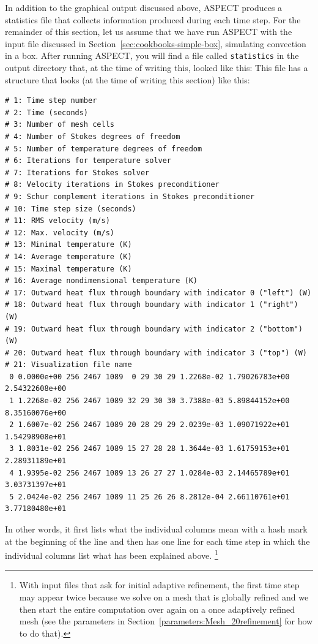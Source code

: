 \documentclass{article}
\newcommand{\aspect}{\textsc{ASPECT}}
\begin{document}
In addition to the graphical output discussed above, \aspect{} produces a
statistics file that collects information produced during each time step.
For the remainder of this section, let us assume that we have run \aspect{}
with the input file discussed in Section~\ref{sec:cookbooks-simple-box},
simulating convection in a box. After running \aspect{}, you will find
a file called \texttt{statistics} in the output directory that, at the time
of writing this, looked like this:
This file has a structure that looks (at the time of writing this section)
like this:
\begin{lstlisting}[frame=single,language=ksh,showstringspaces=false]
# 1: Time step number
# 2: Time (seconds)
# 3: Number of mesh cells
# 4: Number of Stokes degrees of freedom
# 5: Number of temperature degrees of freedom
# 6: Iterations for temperature solver
# 7: Iterations for Stokes solver
# 8: Velocity iterations in Stokes preconditioner
# 9: Schur complement iterations in Stokes preconditioner
# 10: Time step size (seconds)
# 11: RMS velocity (m/s)
# 12: Max. velocity (m/s)
# 13: Minimal temperature (K)
# 14: Average temperature (K)
# 15: Maximal temperature (K)
# 16: Average nondimensional temperature (K)
# 17: Outward heat flux through boundary with indicator 0 ("left") (W)
# 18: Outward heat flux through boundary with indicator 1 ("right") (W)
# 19: Outward heat flux through boundary with indicator 2 ("bottom") (W)
# 20: Outward heat flux through boundary with indicator 3 ("top") (W)
# 21: Visualization file name
 0 0.0000e+00 256 2467 1089  0 29 30 29 1.2268e-02 1.79026783e+00 2.54322608e+00
 1 1.2268e-02 256 2467 1089 32 29 30 30 3.7388e-03 5.89844152e+00 8.35160076e+00
 2 1.6007e-02 256 2467 1089 20 28 29 29 2.0239e-03 1.09071922e+01 1.54298908e+01
 3 1.8031e-02 256 2467 1089 15 27 28 28 1.3644e-03 1.61759153e+01 2.28931189e+01
 4 1.9395e-02 256 2467 1089 13 26 27 27 1.0284e-03 2.14465789e+01 3.03731397e+01
 5 2.0424e-02 256 2467 1089 11 25 26 26 8.2812e-04 2.66110761e+01 3.77180480e+01
 \end{lstlisting}

In other words, it first lists what the individual columns mean with a hash
mark at the beginning of the line and then has one line for each time step
in which the individual columns list what has been explained above.%
\footnote{With
  input files that ask for initial adaptive refinement, the first time step may
  appear twice because we solve on a mesh
  that is globally refined and we then start the entire computation
  over again on a once adaptively refined mesh (see the parameters in
  Section~\ref{parameters:Mesh_20refinement} for how to do that).}
\end{document}
